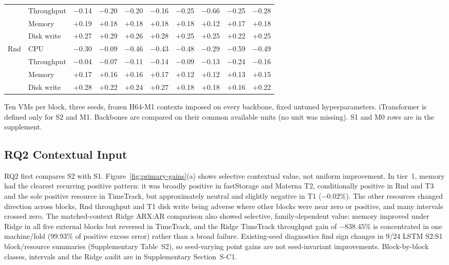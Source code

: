 \documentclass[5p,twocolumn]{elsarticle}
\begin{document}
\begin{table}[t]
\begin{tabular*}{\textwidth}{@{\extracolsep{\fill}}llrrrrrrrr@{}}
     & Throughput & $-$0.14 & $-$0.20 & $-$0.20 & $-$0.16 & $-$0.25 & $-$0.66 & $-$0.25 & $-$0.28 \\
     & Memory & +0.19 & +0.18 & +0.18 & +0.18 & +0.18 & +0.12 & +0.17 & +0.18 \\
     & Disk write & +0.27 & +0.29 & +0.26 & +0.28 & +0.25 & +0.25 & +0.22 & +0.25 \\
    Rnd & CPU & $-$0.30 & $-$0.09 & $-$0.46 & $-$0.43 & $-$0.48 & $-$0.29 & $-$0.59 & $-$0.49 \\
     & Throughput & $-$0.04 & $-$0.07 & $-$0.11 & $-$0.14 & $-$0.09 & $-$0.13 & $-$0.24 & $-$0.16 \\
     & Memory & +0.17 & +0.16 & +0.16 & +0.17 & +0.12 & +0.12 & +0.13 & +0.15 \\
     & Disk write & +0.28 & +0.22 & +0.24 & +0.27 & +0.18 & +0.18 & +0.16 & +0.22 \\
    \bottomrule
  \end{tabular*}

  \vspace{2pt}
  \parbox{\textwidth}{\footnotesize Ten VMs per block, three seeds, frozen H64-M1 contexts imposed on every backbone, fixed untuned hyperparameters. iTransformer is defined only for S2 and M1. Backbones are compared on their common available units (no unit was missing). S1 and M0 rows are in the supplement.}
\end{table}


\subsection{RQ2 Contextual Input}
\label{sec:results-rq1}

RQ2 first compares S2 with S1. Figure~\ref{fig:primary-gains}(a) shows
selective contextual value, not uniform improvement. In tier~1, memory had the
clearest recurring positive pattern: it was broadly positive in fastStorage
and Materna T2, conditionally positive in Rnd and T3 and the sole positive
resource in TimeTrack, but approximately neutral and slightly negative in T1
($-0.02\%$). The other resources changed direction across blocks, Rnd
throughput and T1 disk write being adverse where other blocks were near zero
or positive, and many intervals crossed zero. The matched-context Ridge
ARX:AR comparison also showed selective, family-dependent value: memory
improved under Ridge in all five external blocks but reversed in TimeTrack,
and the Ridge TimeTrack throughput gain of $-838.45\%$ is concentrated in one
machine/fold ($99.93\%$ of positive excess error) rather than a broad
failure. Existing-seed diagnostics find sign changes in 9/24 LSTM S2:S1
block/resource summaries (Supplementary Table~S2), so seed-varying point gains
are not seed-invariant improvements. Block-by-block classes, intervals and the
Ridge audit are in Supplementary Section~S-C1.
\end{document}
